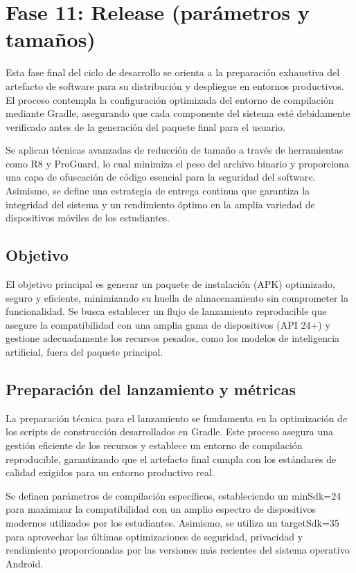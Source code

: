 \section{Fase 11: Release (parámetros y tamaños)}

Esta fase final del ciclo de desarrollo se orienta a la preparación exhaustiva del artefacto de software para su distribución y despliegue en entornos productivos. El proceso contempla la configuración optimizada del entorno de compilación mediante Gradle, asegurando que cada componente del sistema esté debidamente verificado antes de la generación del paquete final para el usuario.

Se aplican técnicas avanzadas de reducción de tamaño a través de herramientas como R8 y ProGuard, lo cual minimiza el peso del archivo binario y proporciona una capa de ofuscación de código esencial para la seguridad del software. Asimismo, se define una estrategia de entrega continua que garantiza la integridad del sistema y un rendimiento óptimo en la amplia variedad de dispositivos móviles de los estudiantes.

\subsection{Objetivo}
El objetivo principal es generar un paquete de instalación (APK) optimizado, seguro y eficiente, minimizando su huella de almacenamiento sin comprometer la funcionalidad. Se busca establecer un flujo de lanzamiento reproducible que asegure la compatibilidad con una amplia gama de dispositivos (API 24+) y gestione adecuadamente los recursos pesados, como los modelos de inteligencia artificial, fuera del paquete principal.

\subsection{Preparación del lanzamiento y métricas}
La preparación técnica para el lanzamiento se fundamenta en la optimización de los scripts de construcción desarrollados en Gradle. Este proceso asegura una gestión eficiente de los recursos y establece un entorno de compilación reproducible, garantizando que el artefacto final cumpla con los estándares de calidad exigidos para un entorno productivo real.

Se definen parámetros de compilación específicos, estableciendo un minSdk=24 para maximizar la compatibilidad con un amplio espectro de dispositivos modernos utilizados por los estudiantes. Asimismo, se utiliza un targetSdk=35 para aprovechar las últimas optimizaciones de seguridad, privacidad y rendimiento proporcionadas por las versiones más recientes del sistema operativo Android.

